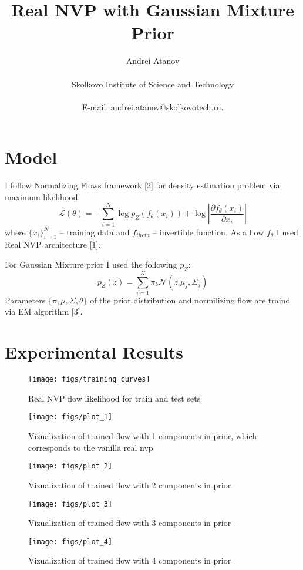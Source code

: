 \documentclass[12pt]{article}
\title{Real NVP with Gaussian Mixture Prior}
\author
{Andrei Atanov\\
\\
\normalsize{Skolkovo Institute of Science and Technology}\\
\\
\normalsize{E-mail:  andrei.atanov@skolkovotech.ru.}
}
\begin{document}
 

\maketitle 

\section{Model}
I follow Normalizing Flows framework [2] for density estimation problem via maximum likelihood:
\begin{equation*}
\mathcal{L}(\theta) = -\sum_{i=1}^N \log p_Z(f_{\theta}(x_i)) + \log \left| \dfrac{\partial f_{\theta}(x_i)}{\partial x_i} \right|
\end{equation*}
where $\{x_i\}_{i=1}^N$ -- training data and $f_{theta}$ -- invertible function. As a flow $f_{\theta}$ I used Real NVP architecture [1].

For Gaussian Mixture prior I used the following $p_Z$:
\begin{equation*}
p_Z(z) = \sum_{i=1}^{K} \pi_k \mathcal{N}(z|\mu_j, \Sigma_j)
\end{equation*}
Parameters $\{\pi, \mu, \Sigma, \theta\}$ of the prior distribution and normilizing flow are traind via EM algorithm [3].
\section{Experimental Results}

\begin{figure}[ht]
    \centering
    \texttt{[image: figs/training\_curves]}
    \caption{Real NVP flow likelihood for train and test sets}
\end{figure}

\begin{figure}[ht]
    \centering
    \texttt{[image: figs/plot\_1]}
    \caption{Vizualization of trained flow with 1 components in prior, which corresponds to the vanilla real nvp}
\end{figure}
\begin{figure}[ht]
    \centering
    \texttt{[image: figs/plot\_2]}
    \caption{Vizualization of trained flow with 2 components in prior}
\end{figure}
\begin{figure}[ht]
    \centering
    \texttt{[image: figs/plot\_3]}
    \caption{Vizualization of trained flow with 3 components in prior}
\end{figure}
\begin{figure}[ht]
    \centering
    \texttt{[image: figs/plot\_4]}
    \caption{Vizualization of trained flow with 4 components in prior}
\end{figure}
\end{document}
